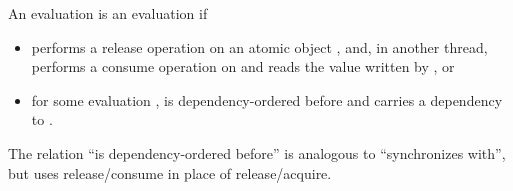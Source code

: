 \pnum
An evaluation  is  an evaluation
 if
\begin{itemize}
\item
{} performs a release operation on an atomic object , and, in
another thread,  performs a consume operation on  and reads
the value written by , or

\item
for some evaluation ,  is dependency-ordered before  and
 carries a dependency to .

\end{itemize}
\begin{note} The relation ``is dependency-ordered before'' is analogous to
``synchronizes with'', but uses release/consume in place of release/acquire.
\end{note}

